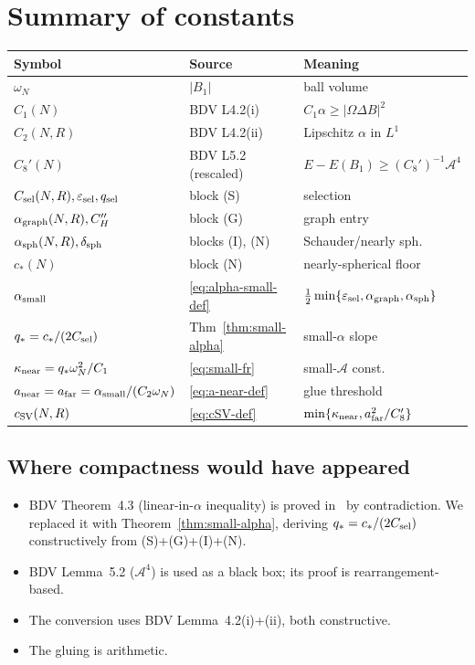 \documentclass[11pt]{article}
\theoremstyle{definition}
\newcommand{\Fr}{\mathcal{A}}
\newcommand{\eps}{\varepsilon}
\begin{document}
\section{Summary of constants}\label{sec:summary}

\renewcommand{\arraystretch}{1.25}
\begin{center}
\begin{tabular}{|l|l|l|}\hline
Symbol & Source & Meaning \\\hline
$\omega_{N}$ & $|B_{1}|$ & ball volume \\
$C_{1}(N)$ & BDV L4.2(i) & $C_{1}\alpha\ge|\Omega\Delta B|^{2}$ \\
$C_{2}(N,R)$ & BDV L4.2(ii) & Lipschitz $\alpha$ in $L^{1}$ \\
$C_{8}'(N)$ & BDV L5.2 (rescaled) & $E-E(B_{1})\ge(C_{8}')^{-1}\Fr^{4}$ \\
$C_{\rm sel}(N,R),\eps_{\rm sel},q_{\rm sel}$ & block (S) & selection \\
$\alpha_{\rm graph}(N,R),C_{H}''$ & block (G) & graph entry \\
$\alpha_{\rm sph}(N,R),\delta_{\rm sph}$ & blocks (I), (N) & Schauder/nearly sph.\ \\
$c_{*}(N)$ & block (N) & nearly-spherical floor \\\hline
$\alpha_{\rm small}$ & \eqref{eq:alpha-small-def} & $\tfrac12\min\{\eps_{\rm sel},\alpha_{\rm graph},\alpha_{\rm sph}\}$ \\
$q_{*}=c_{*}/(2C_{\rm sel})$ & Thm~\ref{thm:small-alpha} & small-$\alpha$ slope \\
$\kappa_{\rm near}=q_{*}\omega_{N}^{2}/C_{1}$ & \eqref{eq:small-fr} & small-$\Fr$ const. \\
$a_{\rm near}=a_{\rm far}=\alpha_{\rm small}/(C_{2}\omega_{N})$ & \eqref{eq:a-near-def} & glue threshold \\
$c_{\rm SV}(N,R)$ & \eqref{eq:cSV-def} & $\min\{\kappa_{\rm near},a_{\rm far}^{2}/C_{8}'\}$ \\\hline
\end{tabular}
\end{center}

\subsection*{Where compactness would have appeared}

\begin{itemize}
\item BDV Theorem~4.3 (linear-in-$\alpha$ inequality) is proved
in~\cite{BDV} by contradiction. We replaced it with
Theorem~\ref{thm:small-alpha}, deriving $q_{*}=c_{*}/(2C_{\rm sel})$
constructively from (S)+(G)+(I)+(N).
\item BDV Lemma~5.2 ($\Fr^{4}$) is used as a black box; its proof is
rearrangement-based.
\item The conversion uses BDV Lemma~4.2(i)+(ii), both constructive.
\item The gluing is arithmetic.
\end{itemize}
\end{document}
